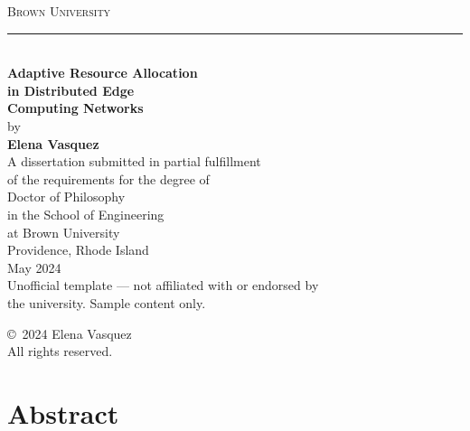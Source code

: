 \documentclass[12pt,oneside]{report}
\begin{document}
\begin{titlepage}
\centering
\vspace*{2.5cm}

{\LARGE\scshape\color{brown} Brown University}\\[0.5cm]

{\color{brown}\rule{0.6\textwidth}{1.2pt}}\\[1.5cm]

{\Huge\bfseries Adaptive Resource Allocation}\\[0.3cm]
{\Huge\bfseries in Distributed Edge}\\[0.3cm]
{\Huge\bfseries Computing Networks}\\[2cm]

{\Large by}\\[0.5cm]

{\Large\bfseries Elena Vasquez}\\[2.5cm]

{\large A dissertation submitted in partial fulfillment}\\[0.2cm]
{\large of the requirements for the degree of}\\[0.2cm]
{\large Doctor of Philosophy}\\[0.2cm]
{\large in the School of Engineering}\\[0.2cm]
{\large at Brown University}\\[1.5cm]

{\large Providence, Rhode Island}\\[0.2cm]
{\large May 2024}\\[3cm]

{\footnotesize\color{darkgray} Unofficial template --- not affiliated with or endorsed by\\the university. Sample content only.}

\end{titlepage}

\clearpage

\thispagestyle{empty}
\vspace*{6pt}
\begin{center}
\Large\color{darkgray}
\copyright\ 2024 Elena Vasquez\\[0.2cm]
All rights reserved.
\end{center}

\vspace{1.5cm}

\chapter*{Abstract}
\end{document}
